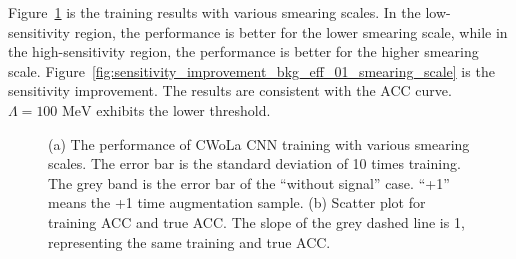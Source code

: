 \documentclass[12pt]{article}
\begin{document}
        Figure~\ref{fig:cwola_cnn_training_performance_smearing_scale} is the training results with various smearing scales. In the low-sensitivity region, the performance is better for the lower smearing scale, while in the high-sensitivity region, the performance is better for the higher smearing scale. Figure~\ref{fig:sensitivity_improvement_bkg_eff_01_smearing_scale} is the sensitivity improvement. The results are consistent with the ACC curve. $\Lambda = \text{100 MeV}$ exhibits the lower threshold.
        \begin{figure}[htpb]
            \centering
            \caption{(a) The performance of CWoLa CNN training with various smearing scales. The error bar is the standard deviation of 10 times training. The grey band is the error bar of the ``without signal'' case. ``+1'' means the +1 time augmentation sample. (b) Scatter plot for training ACC and true ACC. The slope of the grey dashed line is 1, representing the same training and true ACC.}
            \label{fig:cwola_cnn_training_performance_smearing_scale}
        \end{figure}
\end{document}
